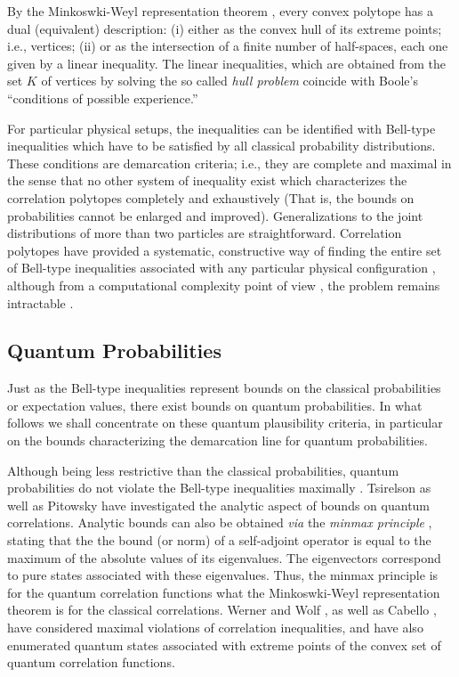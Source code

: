 By the Minkoswki-Weyl representation theorem \cite[p.29]{ziegler},
every convex polytope has a dual (equivalent) description:
(i)
either as the convex hull of its extreme points; i.e., vertices;
(ii)
or as the intersection of a finite number of half-spaces,
each one given by a linear inequality.
The linear inequalities,
which are obtained
from the set $K$ of vertices
by solving the so called {\em hull problem}
coincide with Boole's ``conditions of possible experience.''

For particular physical setups,
the inequalities can be identified with Bell-type inequalities which have to be satisfied by
all classical probability distributions.
These conditions are demarcation criteria; i.e.,
they are complete and maximal in the sense that no other system of inequality exist
which characterizes the correlation polytopes completely and exhaustively
(That is, the bounds on probabilities cannot be enlarged and improved).
Generalizations to the joint distributions of more than two particles are straightforward.
Correlation polytopes have provided a systematic, constructive way of finding
the entire set of Bell-type inequalities associated with any particular physical configuration
\cite{2000-poly,2001-cddif}, although from a computational complexity point of view
\cite{garey}, the problem remains intractable \cite{Pit-91}.

\subsection{Quantum Probabilities}

Just as the Bell-type inequalities represent bounds on the
classical probabilities or expectation values,
there exist bounds on quantum probabilities.
In what follows we shall concentrate on these
quantum plausibility criteria, in particular on the bounds
characterizing the demarcation line for quantum probabilities.

Although being less restrictive than the classical probabilities,
quantum probabilities do not violate the
Bell-type inequalities maximally
\cite{pop-rohr,mermin-1995,svozil-krenn}.
Tsirelson \cite{cirelson:80,cirelson,khalfin-97}
as well as Pitowsky \cite{pit:range-2001}
have investigated the analytic aspect of bounds on quantum
correlations.
Analytic bounds can also be obtained {\it via} the
{\em minmax principle} \cite[\S 90]{halmos-vs}, stating that
the the bound (or norm) of a self-adjoint operator is equal to the maximum
of the absolute values of its eigenvalues.
The eigenvectors correspond to pure states associated with these eigenvalues.
Thus, the minmax principle is for the quantum correlation functions
what the Minkoswki-Weyl representation theorem is for the classical correlations.
Werner and Wolf \cite{werner-wolf-2001}, as well as Cabello \cite{cabello-2003a},
have considered maximal violations
of correlation inequalities, and have also enumerated quantum states
associated with extreme points of the convex set of quantum correlation functions.

